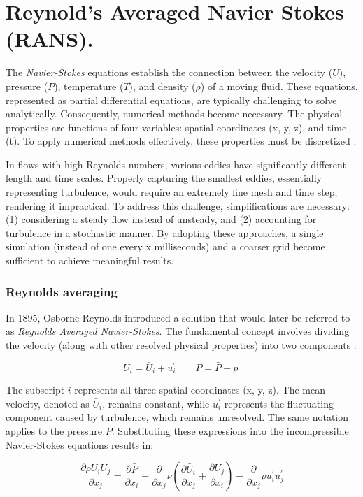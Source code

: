 \section{Reynold's Averaged Navier Stokes (RANS).}
The \textit{Navier-Stokes} equations establish the connection between the
velocity ($U$), pressure ($P$), temperature ($T$), and density ($\rho$) of a
moving fluid. These equations, represented as partial differential equations,
are typically challenging to solve analytically. Consequently, numerical
methods become necessary. The physical properties are functions of four
variables: spatial coordinates (x, y, z), and time (t). To apply numerical
methods effectively, these properties must be discretized \cite{nasaNS}.

In flows with high Reynolds numbers, various eddies have significantly
different length and time scales. Properly capturing the smallest eddies,
essentially representing turbulence, would require an extremely fine mesh and
time step, rendering it impractical. To address this challenge, simplifications
are necessary: (1) considering a steady flow instead of unsteady, and (2)
accounting for turbulence in a stochastic manner. By adopting these approaches,
a single simulation (instead of one every x milliseconds) and a coarser grid
become sufficient to achieve meaningful results.


\subsubsection{Reynolds averaging}
In 1895, Osborne Reynolds introduced a solution that would later be referred to
as \textit{Reynolds Averaged Navier-Stokes}. The fundamental concept involves
dividing the velocity (along with other resolved physical properties) into two
components\cite{leschziner2015statistical} :

\begin{equation}
    U_{i} = \bar U_{i} + u_{i}^{\prime} \qquad
    P = \bar P + p^{\prime}
\end{equation}

\noindent The subscript $i$ represents all three spatial coordinates (x, y, z).
The mean velocity, denoted as $\bar U_{i}$, remains constant, while
$u_{i}^{\prime}$ represents the fluctuating component caused by turbulence,
which remains unresolved. The same notation applies to the pressure $P$.
Substituting these expressions into the incompressible Navier-Stokes equations
results in:

\begin{equation}
    \label{eq:incomp_RANS}
    \frac{\partial \rho \bar U_{i} \bar U_{j}}{\partial x_{j}} =
    \frac{\partial \bar P}{\partial x_{i}} +
    \frac{\partial}{\partial x_{j}} \nu (\frac{\partial 
    \bar U_{i}}{\partial x_{j}} +
    \frac{\partial \bar U_{j}}{\partial x_{i}}) -
    \frac{\partial}{\partial x_{j}} \rho u_{i}^{\prime} u_{j}^{\prime}
\end{equation}

